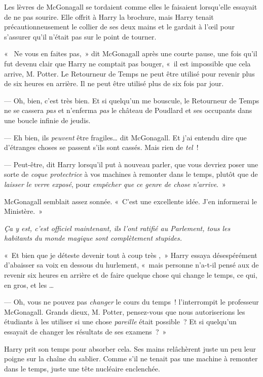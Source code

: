Les lèvres de McGonagall se tordaient comme elles le faisaient lorsqu'elle essayait de ne pas sourire. Elle offrit à Harry la brochure, mais Harry tenait précautionneusement le collier de ses deux mains et le gardait à l'œil pour s'assurer qu'il n'était pas sur le point de tourner.

«~ Ne vous en faites pas,~» dit McGonagall après une courte pause, une fois qu'il fut devenu clair que Harry ne comptait pas bouger, «~il est impossible que cela arrive, M. Potter. Le Retourneur de Temps ne peut être utilisé pour revenir plus de six heures en arrière. Il ne peut être utilisé plus de six fois par jour.

--- Oh, bien, c'est très bien. Et si quelqu'un me bouscule, le Retourneur de Temps ne se cassera \emph{pas} et n'enferma \emph{pas} le château de Poudlard et ses occupants dans une boucle infinie de jeudis.

--- Eh bien, ils \emph{peuvent} être fragiles… dit McGonagall. Et j'ai entendu dire que d'étranges choses se passent s'ils sont cassés. Mais rien de \emph{tel}~!

--- Peut-être, dit Harry lorsqu'il put à nouveau parler, que vous devriez poser une sorte de \emph{coque protectrice} à vos machines à remonter dans le temps, plutôt que de \emph{laisser le verre exposé}, pour \emph{empêcher que ce genre de chose n'arrive}.~»

McGonagall semblait assez sonnée. «~C'est une excellente idée. J'en informerai le Ministère.~»

\emph{Ça y est, c'est officiel maintenant, ils l'ont ratifié au Parlement, tous les habitants du monde magique sont complètement stupides.}

«~Et bien que je déteste devenir tout à coup très ,~» Harry essaya désespérément d'abaisser sa voix en dessous du hurlement, «~mais personne n'a-t-il pensé aux  de revenir six heures en arrière et de faire quelque chose qui change le temps, ce qui, en gros,  et les …

--- Oh, vous ne pouvez pas \emph{changer} le cours du temps~! l'interrompit le professeur McGonagall. Grands dieux, M. Potter, pensez-vous que nous autoriserions les étudiants à les utiliser si une chose \emph{pareille} était possible~? Et si quelqu'un essayait de changer les résultats de ses examens~?~»

Harry prit son temps pour absorber cela. Ses mains relâchèrent juste un peu leur poigne sur la chaîne du sablier. Comme s'il ne tenait pas une machine à remonter dans le temps, juste une tête nucléaire enclenchée.

